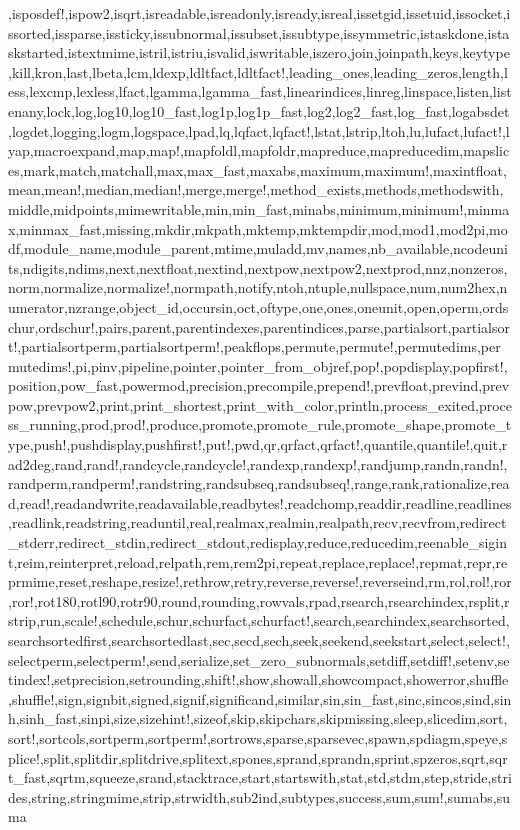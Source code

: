 {,isposdef!,ispow2,isqrt,isreadable,isreadonly,isready,isreal,issetgid,issetuid,issocket,issorted,issparse,issticky,issubnormal,issubset,issubtype,issymmetric,istaskdone,istaskstarted,istextmime,istril,istriu,isvalid,iswritable,iszero,join,joinpath,keys,keytype,kill,kron,last,lbeta,lcm,ldexp,ldltfact,ldltfact!,leading_ones,leading_zeros,length,less,lexcmp,lexless,lfact,lgamma,lgamma_fast,linearindices,linreg,linspace,listen,listenany,lock,log,log10,log10_fast,log1p,log1p_fast,log2,log2_fast,log_fast,logabsdet,logdet,logging,logm,logspace,lpad,lq,lqfact,lqfact!,lstat,lstrip,ltoh,lu,lufact,lufact!,lyap,macroexpand,map,map!,mapfoldl,mapfoldr,mapreduce,mapreducedim,mapslices,mark,match,matchall,max,max_fast,maxabs,maximum,maximum!,maxintfloat,mean,mean!,median,median!,merge,merge!,method_exists,methods,methodswith,middle,midpoints,mimewritable,min,min_fast,minabs,minimum,minimum!,minmax,minmax_fast,missing,mkdir,mkpath,mktemp,mktempdir,mod,mod1,mod2pi,modf,module_name,module_parent,mtime,muladd,mv,names,nb_available,ncodeunits,ndigits,ndims,next,nextfloat,nextind,nextpow,nextpow2,nextprod,nnz,nonzeros,norm,normalize,normalize!,normpath,notify,ntoh,ntuple,nullspace,num,num2hex,numerator,nzrange,object_id,occursin,oct,oftype,one,ones,oneunit,open,operm,ordschur,ordschur!,pairs,parent,parentindexes,parentindices,parse,partialsort,partialsort!,partialsortperm,partialsortperm!,peakflops,permute,permute!,permutedims,permutedims!,pi,pinv,pipeline,pointer,pointer_from_objref,pop!,popdisplay,popfirst!,position,pow_fast,powermod,precision,precompile,prepend!,prevfloat,prevind,prevpow,prevpow2,print,print_shortest,print_with_color,println,process_exited,process_running,prod,prod!,produce,promote,promote_rule,promote_shape,promote_type,push!,pushdisplay,pushfirst!,put!,pwd,qr,qrfact,qrfact!,quantile,quantile!,quit,rad2deg,rand,rand!,randcycle,randcycle!,randexp,randexp!,randjump,randn,randn!,randperm,randperm!,randstring,randsubseq,randsubseq!,range,rank,rationalize,read,read!,readandwrite,readavailable,readbytes!,readchomp,readdir,readline,readlines,readlink,readstring,readuntil,real,realmax,realmin,realpath,recv,recvfrom,redirect_stderr,redirect_stdin,redirect_stdout,redisplay,reduce,reducedim,reenable_sigint,reim,reinterpret,reload,relpath,rem,rem2pi,repeat,replace,replace!,repmat,repr,reprmime,reset,reshape,resize!,rethrow,retry,reverse,reverse!,reverseind,rm,rol,rol!,ror,ror!,rot180,rotl90,rotr90,round,rounding,rowvals,rpad,rsearch,rsearchindex,rsplit,rstrip,run,scale!,schedule,schur,schurfact,schurfact!,search,searchindex,searchsorted,searchsortedfirst,searchsortedlast,sec,secd,sech,seek,seekend,seekstart,select,select!,selectperm,selectperm!,send,serialize,set_zero_subnormals,setdiff,setdiff!,setenv,setindex!,setprecision,setrounding,shift!,show,showall,showcompact,showerror,shuffle,shuffle!,sign,signbit,signed,signif,significand,similar,sin,sin_fast,sinc,sincos,sind,sinh,sinh_fast,sinpi,size,sizehint!,sizeof,skip,skipchars,skipmissing,sleep,slicedim,sort,sort!,sortcols,sortperm,sortperm!,sortrows,sparse,sparsevec,spawn,spdiagm,speye,splice!,split,splitdir,splitdrive,splitext,spones,sprand,sprandn,sprint,spzeros,sqrt,sqrt_fast,sqrtm,squeeze,srand,stacktrace,start,startswith,stat,std,stdm,step,stride,strides,string,stringmime,strip,strwidth,sub2ind,subtypes,success,sum,sum!,sumabs,suma}
